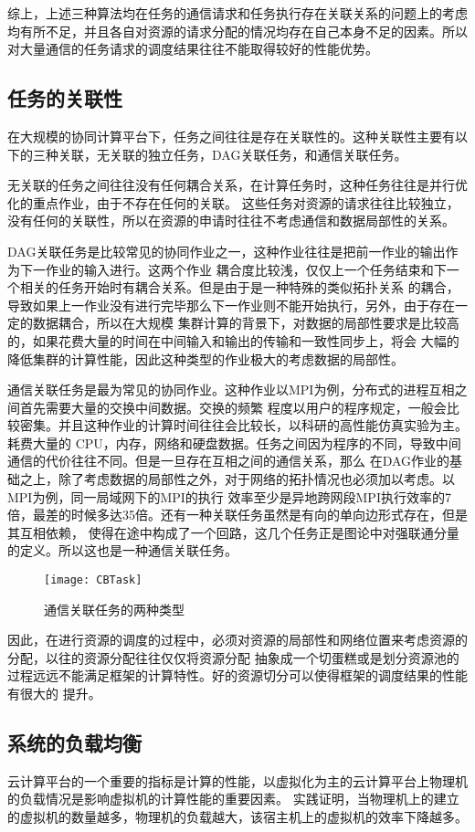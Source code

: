 综上，上述三种算法均在任务的通信请求和任务执行存在关联关系的问题上的考虑均有所不足，并且各自对资源的请求分配的情况均存在自己本身不足的因素。所以对大量通信的任务请求的调度结果往往不能取得较好的性能优势。

\subsection{任务的关联性}
在大规模的协同计算平台下，任务之间往往是存在关联性的。这种关联性主要有以下的三种关联，无关联的独立任务，DAG关联任务，和通信关联任务。

无关联的任务之间往往没有任何耦合关系，在计算任务时，这种任务往往是并行优化的重点作业，由于不存在任何的关联。
这些任务对资源的请求往往比较独立，没有任何的关联性，所以在资源的申请时往往不考虑通信和数据局部性的关系。

DAG关联任务是比较常见的协同作业之一，这种作业往往是把前一作业的输出作为下一作业的输入进行。这两个作业
耦合度比较浅，仅仅上一个任务结束和下一个相关的任务开始时有耦合关系。但是由于是一种特殊的类似拓扑关系
的耦合，导致如果上一作业没有进行完毕那么下一作业则不能开始执行，另外，由于存在一定的数据耦合，所以在大规模
集群计算的背景下，对数据的局部性要求是比较高的，如果花费大量的时间在中间输入和输出的传输和一致性同步上，将会
大幅的降低集群的计算性能，因此这种类型的作业极大的考虑数据的局部性。

通信关联任务是最为常见的协同作业。这种作业以MPI为例，分布式的进程互相之间首先需要大量的交换中间数据。交换的频繁
程度以用户的程序规定，一般会比较密集。并且这种作业的计算时间往往会比较长，以科研的高性能仿真实验为主。耗费大量的
CPU，内存，网络和硬盘数据。任务之间因为程序的不同，导致中间通信的代价往往不同。但是一旦存在互相之间的通信关系，那么
在DAG作业的基础之上，除了考虑数据的局部性之外，对于网络的拓扑情况也必须加以考虑。以MPI为例，同一局域网下的MPI的执行
效率至少是异地跨网段MPI执行效率的7倍，最差的时候多达35倍。还有一种关联任务虽然是有向的单向边形式存在，但是其互相依赖，
使得在途中构成了一个回路，这几个任务正是图论中对强联通分量的定义。所以这也是一种通信关联任务。
\begin{figure}[htbp]
\centering\texttt{[image: CBTask]}
\caption{通信关联任务的两种类型}\label{fig:CBTask}
\end{figure}

因此，在进行资源的调度的过程中，必须对资源的局部性和网络位置来考虑资源的分配，以往的资源分配往往仅仅将资源分配
抽象成一个切蛋糕或是划分资源池的过程远远不能满足框架的计算特性。好的资源切分可以使得框架的调度结果的性能有很大的
提升。

\subsection{系统的负载均衡}
云计算平台的一个重要的指标是计算的性能，以虚拟化为主的云计算平台上物理机的负载情况是影响虚拟机的计算性能的重要因素。
实践证明，当物理机上的建立的虚拟机的数量越多，物理机的负载越大，该宿主机上的虚拟机的效率下降越多。

